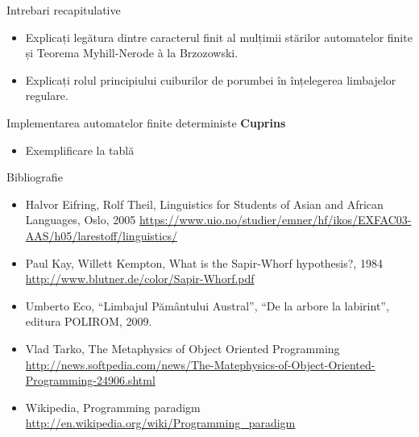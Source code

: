 \documentclass[pdf]{beamer}
\begin{document}
\begin{frame}{Intrebari recapitulative}
\begin{itemize}

\item
Explicați legătura dintre caracterul finit al mulțimii stărilor automatelor finite și Teorema Myhill-Nerode à la Brzozowski.
\newline

\item
Explicați rolul principiului cuiburilor de porumbei în înțelegerea limbajelor regulare.
\newline

\end{itemize}
\end{frame}






\begin{frame}{Implementarea automatelor finite deterministe}
\textbf{Cuprins}
\begin{itemize}
\item
Exemplificare la tablă
\end{itemize}
\end{frame}



\begin{frame}{Bibliografie}
\begin{itemize}
\item
Halvor Eifring, Rolf Theil, Linguistics for Students of Asian and African Languages, Oslo, 2005
\url{https://www.uio.no/studier/emner/hf/ikos/EXFAC03-AAS/h05/larestoff/linguistics/}
\item
Paul Kay, Willett Kempton, What is the Sapir-Whorf hypothesis?, 1984
\url{http://www.blutner.de/color/Sapir-Whorf.pdf}
\item
Umberto Eco, “Limbajul Pământului Austral”, “De la arbore la labirint”, editura POLIROM, 2009.
\item
Vlad Tarko, The Metaphysics of Object Oriented Programming
\url{http://news.softpedia.com/news/The-Matephysics-of-Object-Oriented-Programming-24906.shtml}
\item
Wikipedia, Programming paradigm
\url{http://en.wikipedia.org/wiki/Programming\_paradigm}
\end{itemize}
\end{frame}
\end{document}

